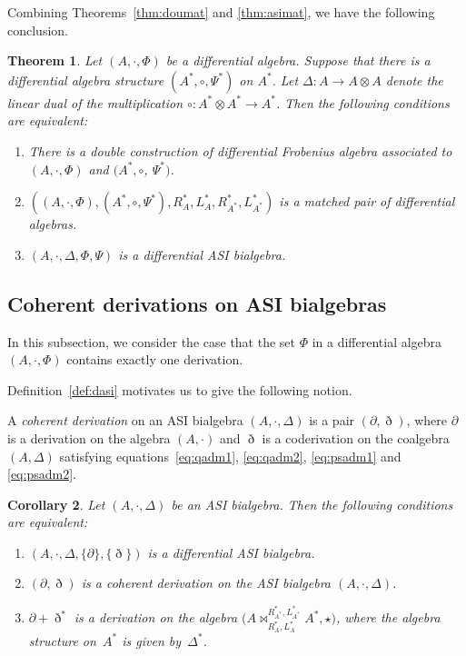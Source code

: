 \documentclass[10pt,a4paper]{amsart}
\numberwithin{equation}{section}
\newtheorem{Theorem}{Theorem}[section]
\newtheorem{Corollary}[Theorem]{Corollary}
\begin{document}
Combining Theorems~\ref{thm:doumat} and \ref{thm:asimat}, we have the following conclusion.
\begin{Theorem}\label{thm:asieqv}
 Let $(A, \cdot, \Phi)$ be a differential algebra.
 Suppose that there is a differential algebra structure $(A^*, \circ, \Psi^*)$ on $A^*$.
 Let $\Delta\colon A \to A \otimes A$ denote the linear dual of the multiplication $\circ\colon A^* \otimes A^* \to A^*$.
 Then the following conditions are equivalent:
 \begin{enumerate}\itemsep=0pt
 \item[$1.$] There is a double construction of differential Frobenius algebra associated to $(A, \cdot, \Phi)$ and $(A^*, \circ$, $\Psi^*)$.
 \item[$2.$] $((A, \cdot, \Phi), (A^*, \circ, \Psi^*), R^*_A, L^*_A, R^*_{A^*}, L^*_{A^*})$ is a matched pair of differential algebras.
 \item[$3.$] $(A, \cdot, \Delta, \Phi, \Psi)$ is a differential ASI bialgebra.
 \end{enumerate}
\end{Theorem}

\subsection{Coherent derivations on ASI bialgebras}
In this subsection, we consider the case that the set $\Phi$ in a differential algebra $(A, \cdot, \Phi)$ contains exactly one derivation.

Definition~\ref{def:dasi} motivates us to give the following notion.

\begin{Definition}\label{def:chd} A \textit{coherent derivation} on an ASI bialgebra $(A, \cdot, \Delta)$ is a pair $(\partial, \eth)$,
 where $\partial$ is a derivation on the algebra $(A, \cdot)$ and $\eth$ is a coderivation on the coalgebra $(A, \Delta)$
 satisfying equations~\eqref{eq:qadm1}, \eqref{eq:qadm2}, \eqref{eq:psadm1} and \eqref{eq:psadm2}.
\end{Definition}

\begin{Corollary}\label{cor:chd}
Let $(A,\cdot,\Delta)$ be an ASI bialgebra. Then the following conditions are equivalent:
\begin{enumerate}\itemsep=0pt
\item[$1.$]%
$(A, \cdot, \Delta, \{\partial\}, \{\eth\})$ is a differential ASI bialgebra.
\item[$2.$]%
$(\partial, \eth)$ is a coherent derivation on the ASI bialgebra $(A, \cdot, \Delta)$.
\item[$3.$]%
$\partial + \eth^*$ is a derivation on the algebra $\big(A \bowtie_{R_A^*, L_A^*}^{R_{A^*}^*, L_{A^*}^*}
A^*, \star\big)$, where the algebra structure on~$A^*$ is given by~$\Delta^*$.
\end{enumerate}
\end{Corollary}
\end{document}
